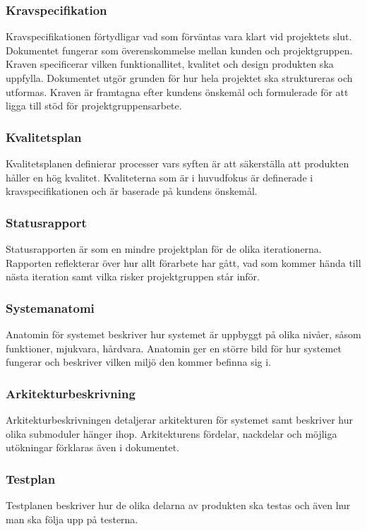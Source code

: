\subsubsection*{Kravspecifikation}
Kravspecifikationen förtydligar vad som förväntas vara klart vid projektets slut. Dokumentet fungerar som överenskommelse mellan kunden och projektgruppen. Kraven specificerar vilken funktionallitet, kvalitet och design produkten ska uppfylla. Dokumentet utgör grunden för hur hela projektet ska struktureras och utformas. Kraven är framtagna efter kundens önskemål och formulerade för att ligga till stöd för projektgruppensarbete.

\subsubsection*{Kvalitetsplan}
Kvalitetsplanen definierar processer vars syften är att säkerställa att produkten håller en hög kvalitet. Kvaliteterna som är i huvudfokus är definerade i kravspecifikationen och är baserade på kundens önskemål.

\subsubsection*{Statusrapport}
Statusrapporten är som en mindre projektplan för
de olika iterationerna. Rapporten reflekterar över hur allt förarbete har gått, vad som kommer
hända till nästa iteration samt vilka risker projektgruppen står inför.

\subsubsection*{Systemanatomi}
Anatomin för systemet beskriver hur systemet är uppbyggt på olika nivåer, såsom funktioner, 
mjukvara, hårdvara. Anatomin ger en större bild för hur systemet fungerar och beskriver vilken miljö den kommer
befinna sig i.

\subsubsection*{Arkitekturbeskrivning}
Arkitekturbeskrivningen detaljerar arkitekturen för systemet samt beskriver hur olika submoduler hänger ihop. Arkitekturens fördelar, nackdelar och möjliga utökningar förklaras även i dokumentet.

\subsubsection*{Testplan}
Testplanen beskriver hur de olika delarna av produkten ska testas och även hur man ska följa upp på testerna.

